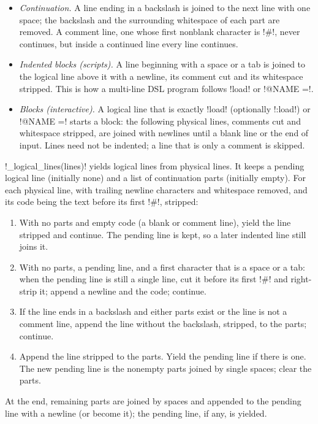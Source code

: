 \begin{itemize}
\item \emph{Continuation.} A line ending in a backslash is joined to the next line with one space; the backslash and the surrounding whitespace of each part are removed. A comment line, one whose first nonblank character is \code!#!, never continues, but inside a continued line every line continues.
\item \emph{Indented blocks (scripts).} A line beginning with a space or a tab is joined to the logical line above it with a newline, its comment cut and its whitespace stripped. This is how a multi-line DSL program follows \azx!load! or \code!@NAME =!.
\item \emph{Blocks (interactive).} A logical line that is exactly \azx!load! (optionally \code!:load!) or \code!@NAME =! starts a block: the following physical lines, comments cut and whitespace stripped, are joined with newlines until a blank line or the end of input. Lines need not be indented; a line that is only a comment is skipped.
\end{itemize}

\begin{algorithm}\label{alg:shell-logical}
\leavevmode
\py!_logical_lines(lines)! yields logical lines from physical lines. It keeps a pending logical line (initially none) and a list of continuation parts (initially empty). For each physical line, with trailing newline characters and whitespace removed, and its code being the text before its first \code!#!, stripped:
\begin{enumerate}
\item With no parts and empty code (a blank or comment line), yield the line stripped and continue. The pending line is kept, so a later indented line still joins it.
\item With no parts, a pending line, and a first character that is a space or a tab: when the pending line is still a single line, cut it before its first \code!#! and right-strip it; append a newline and the code; continue.
\item If the line ends in a backslash and either parts exist or the line is not a comment line, append the line without the backslash, stripped, to the parts; continue.
\item Append the line stripped to the parts. Yield the pending line if there is one. The new pending line is the nonempty parts joined by single spaces; clear the parts.
\end{enumerate}
At the end, remaining parts are joined by spaces and appended to the pending line with a newline (or become it); the pending line, if any, is yielded.
\end{algorithm}

